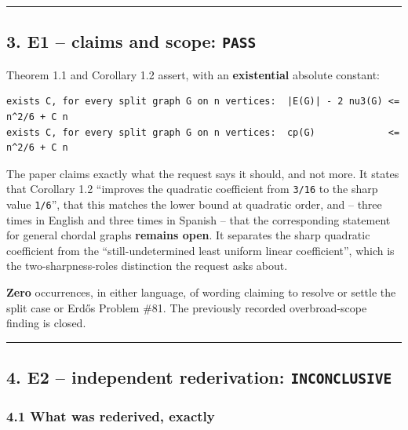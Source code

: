 \documentclass[
  10pt,
]{article}
\begin{document}
\begin{center}\rule{0.5\linewidth}{0.5pt}\end{center}

\subsection{\texorpdfstring{3. E1 -- claims and scope:
\texttt{PASS}}{3. E1 -- claims and scope: PASS}}\label{e1-claims-and-scope-pass}

Theorem 1.1 and Corollary 1.2 assert, with an \textbf{existential}
absolute constant:

\begin{verbatim}
exists C, for every split graph G on n vertices:  |E(G)| - 2 nu3(G) <= n^2/6 + C n
exists C, for every split graph G on n vertices:  cp(G)             <= n^2/6 + C n
\end{verbatim}

The paper claims exactly what the request says it should, and not more.
It states that Corollary 1.2 ``improves the quadratic coefficient from
\texttt{3/16} to the sharp value \texttt{1/6}'', that this matches the
lower bound at quadratic order, and -- three times in English and three
times in Spanish -- that the corresponding statement for general chordal
graphs \textbf{remains open}. It separates the sharp quadratic
coefficient from the ``still-undetermined least uniform linear
coefficient'', which is the two-sharpness-roles distinction the request
asks about.

\textbf{Zero} occurrences, in either language, of wording claiming to
resolve or settle the split case or Erdős Problem \#81. The previously
recorded overbroad-scope finding is closed.

\begin{center}\rule{0.5\linewidth}{0.5pt}\end{center}

\subsection{\texorpdfstring{4. E2 -- independent rederivation:
\texttt{INCONCLUSIVE}}{4. E2 -- independent rederivation: INCONCLUSIVE}}\label{e2-independent-rederivation-inconclusive}

\subsubsection{4.1 What was rederived,
exactly}\label{what-was-rederived-exactly}
\end{document}

